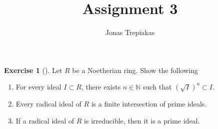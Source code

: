 \documentclass[reqno]{amsart}
\title{Assignment 3}
\author{Jonas Trepiakas}
\date{}
\theoremstyle{definition}
\newtheorem{exercise}[theorem]{Exercise}
\theoremstyle{remark}
\begin{document}
\maketitle
    \begin{exercise}[]
        Let $R$ be a Noetherian ring. Show the following
        \begin{enumerate}
            \item For every ideal
                $I \subset R$, there exists $n \in \mathbb{N} $ 
                such that $\left( \sqrt{I}  \right)^{n}
                \subset I$.
            \item Every radical ideal of $R$ is a finite
                intersection of prime ideals.
            \item If a radical ideal of $R$ is irreducible,
                then it is a prime ideal.
        \end{enumerate}
    \end{exercise}
\end{document}
